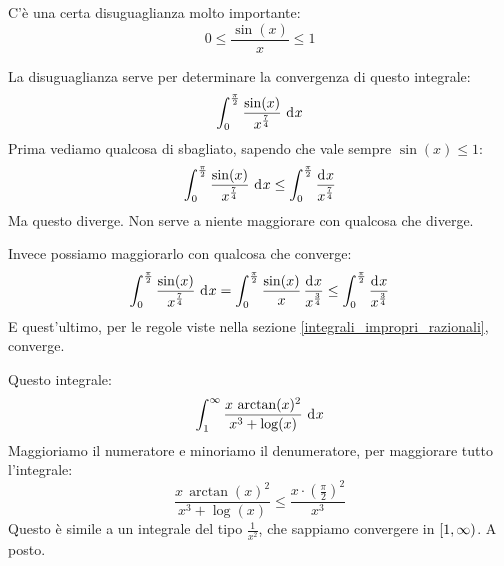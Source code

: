 C'\`e una certa disuguaglianza molto importante:
\[
0 \le \frac{\sin(x)}{x} \le 1
\]

\begin{exmp}
La disuguaglianza serve per determinare la convergenza di questo integrale:
\[
\int_{0}^{\frac{\pi}{2}} \frac{\sin(x)}{x^{\frac{7}{4}}} \dx
\]
Prima vediamo qualcosa di sbagliato, sapendo che vale sempre $\sin(x) \le 1$:
\[
\int_{0}^{\frac{\pi}{2}} \frac{\sin(x)}{x^{\frac{7}{4}}} \dx \le
\int_{0}^{\frac{\pi}{2}} \frac{\diff x}{x^{\frac{7}{4}}}
\]
Ma questo diverge. Non serve a niente maggiorare con qualcosa che diverge.

Invece possiamo maggiorarlo con qualcosa che converge:
\[
\int_{0}^{\frac{\pi}{2}} \frac{\sin(x)}{x^{\frac{7}{4}}} \dx =
\int_{0}^{\frac{\pi}{2}} \frac{\sin(x)}{x} \, \frac{\diff x}{x^{\frac{3}{4}}} \le
\int_{0}^{\frac{\pi}{2}} \frac{\diff x}{x^{\frac{3}{4}}}
\]
E quest'ultimo, per le regole viste nella sezione \ref{integrali_impropri_razionali}, converge.
\end{exmp}

\begin{exmp}
Questo integrale:
\[
\int_{1}^{\infty} \frac{x \, \arctan(x)^2}{x^3 + \log(x)} \dx
\]
Maggioriamo il numeratore e minoriamo il denumeratore, per maggiorare tutto l'integrale:
\[
\frac{x \, \arctan(x)^2}{x^3 + \log(x)} \le \frac{x \cdot \left( \frac{\pi}{2} \right)^2}{x^3}
\]
Questo \`e simile a un integrale del tipo $\frac{1}{x^2}$, che sappiamo convergere in $\left[ {1}, {\infty} \right)$. A posto.
\end{exmp}














